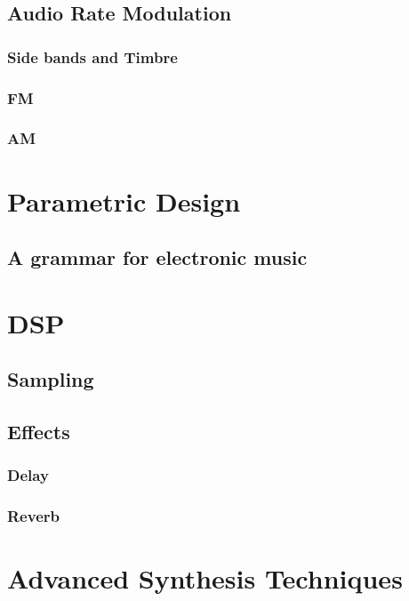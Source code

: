 \documentclass[11pt]{article}
\begin{document}
\subsection{Audio Rate Modulation}
\label{sec:orgf5eb59c}
\subsubsection{Side bands and Timbre}
\label{sec:orgc24984a}
\subsubsection{FM}
\label{sec:org0055191}
\subsubsection{AM}
\label{sec:orgf3fe415}

\section{Parametric Design}
\label{sec:org01aa9b8}
\subsection{A grammar for electronic music}
\label{sec:orgfa436be}

\section{DSP}
\label{sec:orgc979a01}
\subsection{Sampling}
\label{sec:org6b490d5}
\subsection{Effects}
\label{sec:orgfec9906}
\subsubsection{Delay}
\label{sec:orga90ca44}
\subsubsection{Reverb}
\label{sec:orga465e2d}

\section{Advanced Synthesis Techniques}
\label{sec:orgbaa0839}
\end{document}
